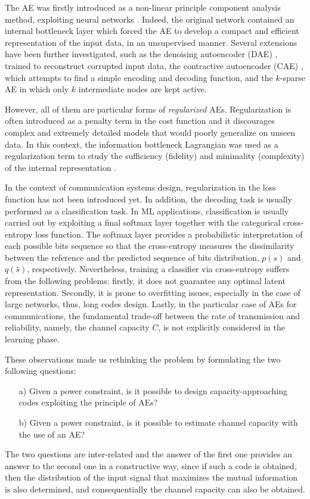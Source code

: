 The AE was firstly introduced as a non-linear principle component analysis method, exploiting neural networks \cite{Kramer1991}. Indeed, the original network contained an internal bottleneck layer which forced the AE to develop a compact and efficient representation of the input data, in an unsupervised manner.
Several extensions have been further investigated, such as the denoising autoencoder (DAE) \cite{Vincent2008}, trained to reconstruct corrupted input data, the contractive autoencoder (CAE) \cite{Rifai2011}, which attempts to find a simple encoding and decoding function, and the $k$-sparse AE \cite{Makhzani2013} in which only $k$ intermediate nodes are kept active.

However, all of them are particular forms of \textit{regularized} AEs. Regularization is often introduced as a penalty term in the cost function and it discourages complex and extremely detailed models that would poorly generalize on unseen data. In this context, the information bottleneck Lagrangian \cite{Tishby1999} was used as a regularization term to study the sufficiency (fidelity) and minimality (complexity) of the internal representation \cite{Alemi2017,Soatto2018}. 

In the context of communication systems design, regularization in the loss function has not been introduced yet. In addition, the decoding task is usually performed as a classification task. In ML applications, classification is usually carried out by exploiting a final softmax layer together with the categorical cross-entropy loss function. The softmax layer provides a probabilistic interpretation of each possible bits sequence so that the cross-entropy measures the dissimilarity between the reference and the predicted sequence of bits distribution, $p(s)$ and $q(\hat{s})$, respectively.
Nevertheless, training a classifier via cross-entropy suffers from the following problems: firstly, it does not guarantee any optimal latent representation. Secondly, it is prone to overfitting issues, especially in the case of large networks, thus, long codes design. 
Lastly, in the particular case of AEs for communications, the fundamental trade-off between the rate of transmission and reliability, namely, the channel capacity $C$, is not explicitly considered in the learning phase. 

These observations made us rethinking the problem by formulating the two following questions:
\begin{itemize}
\item[a)] Given a power constraint, is it possible to design capacity-approaching codes exploiting the principle of AEs?
\item[b)] Given a power constraint, is it possible to estimate channel capacity with the use of an AE?
\end{itemize}
The two questions are inter-related and the answer of the first one provides an answer to the second one in a constructive way, since if such a code is obtained, then the distribution of the input signal that maximizes the mutual information is also determined, and consequentially the channel capacity can also be obtained.

